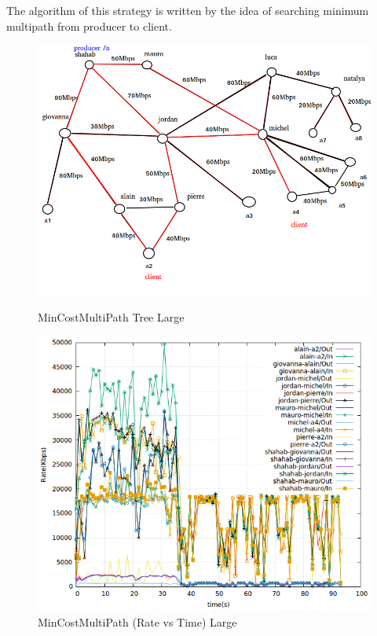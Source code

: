 The algorithm of this strategy is written by the idea of searching minimum multipath from producer to client.

\begin{figure}[H]

\begin{center}

\includegraphics[scale = 0.4]{Figures/MinCostMultipath_big.png}

\caption{MinCostMultiPath Tree Large} \label{MinCostMultiPath} 


\includegraphics[scale = 0.4]{Figures/mincostmultipath_big.png}

\caption{MinCostMultiPath (Rate vs Time) Large} \label{mincostmultipath} 


\end{center}

\end{figure}


